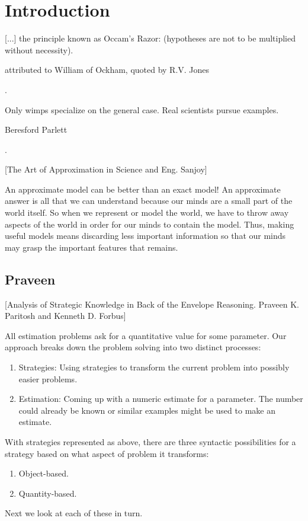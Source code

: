 \section{Introduction}
%
\epigraph{[...] the principle known as Occam's Razor:  (hypotheses are not to be multiplied without necessity).}{attributed to William of Ockham, quoted by R.V. Jones}{\citep[p.95]{gibbings:2011}.}
%
\epigraph{Only wimps specialize on the general case. Real scientists pursue examples.}{Beresford Parlett}{\citep{berry:1995}.}

[The Art of Approximation in Science and Eng. Sanjoy]

An approximate model can be better than an exact model! An approximate answer is all that we can understand because our minds are a small part of the world itself. So when we represent or model the world, we have to throw away aspects of the world in order for our minds to contain the model. Thus, making useful models means discarding less important information so that our minds may grasp the important features that remains.


\subsection{Praveen}
[Analysis of Strategic Knowledge in Back of the Envelope Reasoning. Praveen K. Paritosh and Kenneth D. Forbus]

All estimation problems ask for a quantitative value for some parameter. Our approach breaks down the problem solving into two distinct processes:
%
\begin{enumerate}
\item Strategies: Using strategies to transform the current problem into possibly easier problems.
\item Estimation: Coming up with a numeric estimate for a parameter. The number could already be known or similar examples might be used to make an estimate.
\end{enumerate}

With strategies represented as above, there are three syntactic possibilities for a strategy based on what aspect of problem it transforms:
%
\begin{enumerate}
\item Object-based.
\item Quantity-based.
\end{enumerate}

Next we look at each of these in turn.


